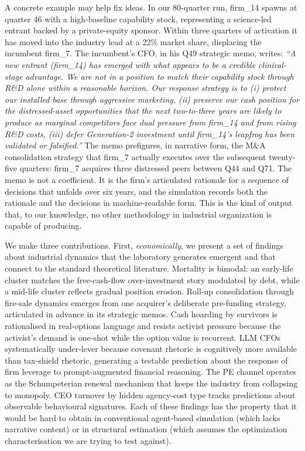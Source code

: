 \documentclass[11pt]{article}
\begin{document}
A concrete example may help fix ideas. In our 80-quarter run, firm\_14
spawns at quarter 46 with a high-baseline capability stock,
representing a science-led entrant backed by a private-equity sponsor.
Within three quarters of activation it has moved into the industry
lead at a 22\% market share, displacing the incumbent firm\_7. The
incumbent's CFO, in his Q49 strategic memo, writes: \emph{``A
new entrant (firm\_14) has emerged with what appears to be a credible
clinical-stage advantage. We are not in a position to match their
capability stock through R\&D alone within a reasonable horizon. Our
response strategy is to (i) protect our installed base through
aggressive marketing, (ii) preserve our cash position for the
distressed-asset opportunities that the next two-to-three years are
likely to produce as marginal competitors face dual pressure from
firm\_14 and from rising R\&D costs, (iii) defer Generation-2
investment until firm\_14's leapfrog has been validated or
falsified.''} The memo prefigures, in narrative form, the M\&A
consolidation strategy that firm\_7 actually executes over the
subsequent twenty-five quarters: firm\_7 acquires three distressed
peers between Q44 and Q71. The memo is not a coefficient. It is the
firm's articulated rationale for a sequence of decisions that
unfolds over six years, and the simulation records both the rationale
and the decisions in machine-readable form. This is the kind of
output that, to our knowledge, no other methodology in industrial
organization is capable of producing.

We make three contributions. First, \textit{economically}, we present
a set of findings about industrial dynamics that the laboratory
generates emergent and that connect to the standard theoretical
literature. Mortality is bimodal: an early-life cluster matches the
\citet{jensen1986agency} free-cash-flow over-investment story
modulated by debt, while a mid-life cluster reflects gradual
position erosion. Roll-up consolidation through \citet{shleifervishny1992}
fire-sale dynamics emerges from one acquirer's deliberate
pre-funding strategy, articulated in advance in its strategic memos.
Cash hoarding by survivors is rationalised in
\citet{dixitpindyck1994} real-options language and resists activist
pressure because the activist's demand is one-shot while the option
value is recurrent. LLM CFOs systematically under-lever because
covenant rhetoric is cognitively more available than tax-shield
rhetoric, generating a testable prediction about the response of
firm leverage to prompt-augmented financial reasoning. The PE
channel operates as the Schumpeterian renewal mechanism that keeps
the industry from collapsing to monopoly. CEO turnover by hidden
agency-cost type tracks \citet{jensen1986agency} predictions about
observable behavioural signatures. Each of these findings has the
property that it would be hard to obtain in conventional
agent-based simulation (which lacks narrative content) or in
structural estimation (which assumes the optimization
characterisation we are trying to test against).
\end{document}
